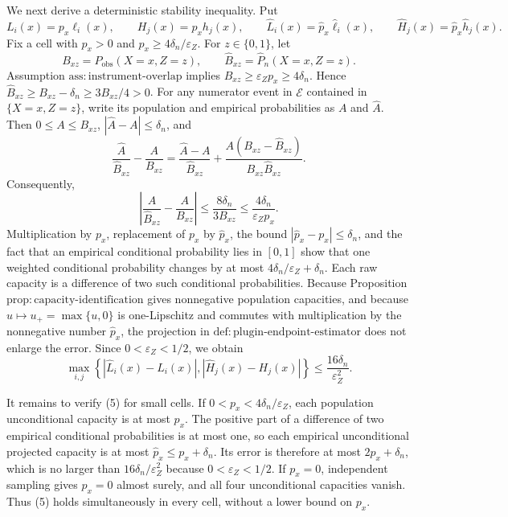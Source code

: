 We next derive a deterministic stability inequality.  Put
\[
L_i(x)=p_x\ell_i(x),\qquad H_j(x)=p_xh_j(x),\qquad
\widehat L_i(x)=\widehat p_x\widehat\ell_i(x),\qquad
\widehat H_j(x)=\widehat p_x\widehat h_j(x).
\]
Fix a cell with \(p_x>0\) and \(p_x\ge4\delta_n/\varepsilon_Z\).  For \(z\in\{0,1\}\), let
\[
B_{xz}=P_{\mathrm{obs}}(X=x,Z=z),\qquad
\widehat B_{xz}=\widehat P_n(X=x,Z=z).
\]
Assumption \(\mathrm{ass{:}instrument\text{-}overlap}\) implies \(B_{xz}\ge\varepsilon_Zp_x\ge4\delta_n\).  Hence \(\widehat B_{xz}\ge B_{xz}-\delta_n\ge3B_{xz}/4>0\).  For any numerator event in \(\mathcal E\) contained in \(\{X=x,Z=z\}\), write its population and empirical probabilities as \(A\) and \(\widehat A\).  Then \(0\le A\le B_{xz}\), \(|\widehat A-A|\le\delta_n\), and
\[
\frac{\widehat A}{\widehat B_{xz}}-\frac{A}{B_{xz}}
=\frac{\widehat A-A}{\widehat B_{xz}}
+\frac{A(B_{xz}-\widehat B_{xz})}
        {B_{xz}\widehat B_{xz}}.
\]
Consequently,
\[
\left|\frac{\widehat A}{\widehat B_{xz}}-
             \frac{A}{B_{xz}}\right|
\le\frac{8\delta_n}{3B_{xz}}
\le\frac{4\delta_n}{\varepsilon_Zp_x}.
\tag{4}
\]
Multiplication by \(p_x\), replacement of \(p_x\) by \(\widehat p_x\), the bound \(|\widehat p_x-p_x|\le\delta_n\), and the fact that an empirical conditional probability lies in \([0,1]\) show that one weighted conditional probability changes by at most \(4\delta_n/\varepsilon_Z+\delta_n\).  Each raw capacity is a difference of two such conditional probabilities.  Because Proposition \(\mathrm{prop{:}capacity\text{-}identification}\) gives nonnegative population capacities, and because \(u\mapsto u_+=\max\{u,0\}\) is one-Lipschitz and commutes with multiplication by the nonnegative number \(\widehat p_x\), the projection in \(\mathrm{def{:}plugin\text{-}endpoint\text{-}estimator}\) does not enlarge the error.  Since \(0<\varepsilon_Z<1/2\), we obtain
\[
\max_{i,j}\left\{|\widehat L_i(x)-L_i(x)|,
                    |\widehat H_j(x)-H_j(x)|\right\}
\le\frac{16\delta_n}{\varepsilon_Z^2}.
\tag{5}
\]

It remains to verify (5) for small cells.  If \(0<p_x<4\delta_n/\varepsilon_Z\), each population unconditional capacity is at most \(p_x\).  The positive part of a difference of two empirical conditional probabilities is at most one, so each empirical unconditional projected capacity is at most \(\widehat p_x\le p_x+\delta_n\).  Its error is therefore at most \(2p_x+\delta_n\), which is no larger than \(16\delta_n/\varepsilon_Z^2\) because \(0<\varepsilon_Z<1/2\).  If \(p_x=0\), independent sampling gives \(\widehat p_x=0\) almost surely, and all four unconditional capacities vanish.  Thus (5) holds simultaneously in every cell, without a lower bound on \(p_x\).

